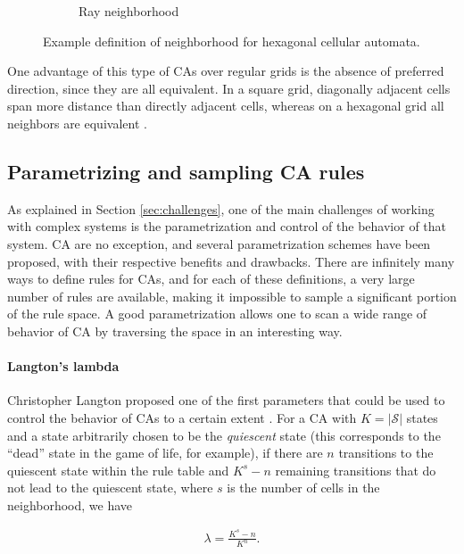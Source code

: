 \begin{figure}[htbp]
\begin{subfigure}[b]{.35\linewidth}
    \caption{Ray neighborhood}
    \label{fig:hexagonal_2}
  \end{subfigure}
  \caption{Example definition of neighborhood for hexagonal cellular automata.}
\label{fig:hexagonal}
\end{figure}

One advantage of this type of \acp{CA} over regular grids is the absence of
preferred direction, since they are all equivalent. In a square grid, diagonally
adjacent cells span more distance than directly adjacent cells, whereas on a   
hexagonal grid all neighbors are equivalent
\parencite{moreeHexagonalSquareLattice2004}.

\subsection{Parametrizing and sampling CA rules}
As explained in Section \ref{sec:challenges}, one of the main challenges of
working with complex systems is the parametrization and control of the behavior
of that system. \ac{CA} are no exception, and several parametrization schemes
have been proposed, with their respective benefits and drawbacks. There are
infinitely many ways to define rules for \acp{CA}, and for each of these
definitions, a very large number of rules are available, making it impossible to
sample a significant portion of the rule space. A good parametrization allows one 
to scan a wide range of behavior of \ac{CA} by traversing the space in an
interesting way.

\paragraph{Langton's lambda\label{sec:langtons-lambda}}

Christopher Langton proposed one of the first parameters that could be used to
control the behavior of \acp{CA} to a certain extent
\parencite{langtonStudyingArtificialLife1986, langtonComputationEdgeChaos1990}.
For a \ac{CA} with $K = |\mathcal{S}|$ states and a state arbitrarily chosen to
be the \emph{quiescent} state (this corresponds to the ``dead'' state in the
game of life, for example), if there are $n$ transitions to the quiescent state
within the rule table and $K^{s} - n$ remaining transitions that do not lead to
the quiescent state, where $s$ is the number of cells in the neighborhood, we
have

\begin{equation}
  \label{eq:langton}
  \begin{aligned}
    \lambda = \frac{K^{s} - n}{K^{n}}.
  \end{aligned}
\end{equation}

